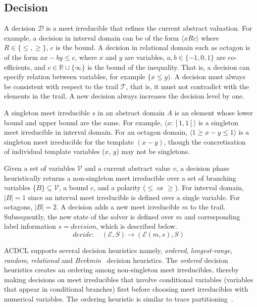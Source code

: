 \subsection{Decision}
A decision $\mathcal{D}$ is a meet irreducible that refines the 
current abstract valuation.  For example, a decision in interval 
domain can be of the form $\langle x R c \rangle$ where 
$R \in \{\leq, \geq\}$, $c$ is the bound.  A decision in 
relational domain such as octagon is of the form $ax - by \leq c$, 
where $x$ and $y$ are variables, $a,b \in \{-1,0,1\}$ are co-efficients, 
and $c \in \mathbb{R}\cup\{\infty\}$ is the bound of the inequality.  
That is, a decision can specify relation between variables, for example 
$\{x \leq y)$.  A decision must always be consistent with respect to 
the trail $\mathcal{T}$, that is, it must not contradict with the elements 
in the trail.  A new decision always increases the decision level by one. 

A singleton meet irreducible $s$ in an abstract domain $A$ is an element 
whose lower bound and upper bound are the same.  For example, 
$\langle x:[1,1] \rangle$ is a singleton meet irreducible in interval domain.  
For an octagon domain, $\langle 1 \geq x-y \leq 1 \rangle$ is a singleton meet 
irreducible for the template $(x-y)$, though the concretisation of individual 
template variables ($x$, $y$) may not be singletons.   

Given a set of variables $\mathcal{V}$ and a current abstract value $v$, 
a decision phase heuristically returns a non-singleton meet irreducible 
over a set of branching variables $\{B\} \subseteq \mathcal{V}$, a 
bound $c$, and a polarity ($\leq$ or $\geq$).  For interval domain, $|B|=1$ 
since an interval meet irreducible is defined over a single variable.  For 
octagons, $|B|=2$.  A decision adds a new meet irreducible $m$ to the trail.  
Subsequently, the new state of the solver is defined over $m$ and corresponding 
label information $s=decision$, which is described below. 
\[decide: \quad (\mathcal{E},S) \rightarrow (\mathcal{E}(m,s),S) \]


ACDCL supports several decision heuristics namely, {\em ordered}, 
{\em longest-range}, {\em random}, {\em relational} and 
{\em Berkmin}~\cite{eugoldberg07} decision heuristics.  
The {\em ordered} decision heuristics creates an ordering among non-singleton 
meet irreducibles, thereby making decisions on meet irreducibles that involve 
conditional variables (variables that appear in conditional branches) first 
before choosing meet irreducibles with numerical variables.  
The ordering heuristic is similar to trace partitioning~\cite{toplas07}.  

